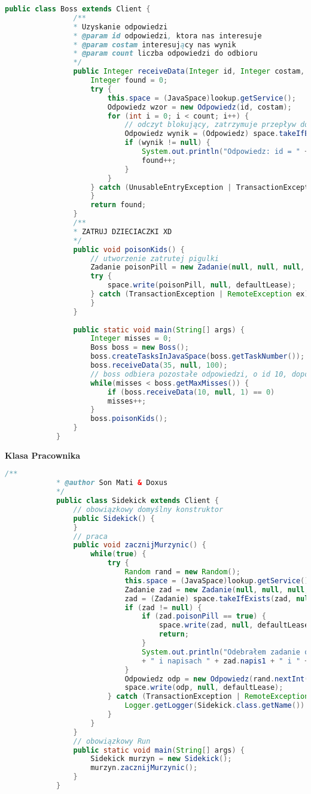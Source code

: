 			\begin{lstlisting}[language=Java]
			public class Boss extends Client {
				/**
				* Uzyskanie odpowiedzi
				* @param id odpowiedzi, ktora nas interesuje
				* @param costam interesujący nas wynik
				* @param count liczba odpowiedzi do odbioru
				*/
				public Integer receiveData(Integer id, Integer costam, Integer count) {
					Integer found = 0;
					try {
						this.space = (JavaSpace)lookup.getService();
						Odpowiedz wzor = new Odpowiedz(id, costam);
						for (int i = 0; i < count; i++) {
							// odczyt blokujący, zatrzymuje przepływ dopóki odp się nie pojawi
							Odpowiedz wynik = (Odpowiedz) space.takeIfExists(wzor, null, defaultLease);
							if (wynik != null) {
								System.out.println("Odpowiedz: id = " + wynik.getId() + ", wynik = " + wynik.getWynik());
								found++;
							}
						}
					} catch (UnusableEntryException | TransactionException | InterruptedException | RemoteException ex) {
					}
					return found;
				}
				/**
				* ZATRUJ DZIECIACZKI XD
				*/
				public void poisonKids() {
					// utworzenie zatrutej pigulki
					Zadanie poisonPill = new Zadanie(null, null, null, true);
					try {
						space.write(poisonPill, null, defaultLease);
					} catch (TransactionException | RemoteException ex) {
					}
				}
				
				public static void main(String[] args) {
					Integer misses = 0;
					Boss boss = new Boss();
					boss.createTasksInJavaSpace(boss.getTaskNumber());
					boss.receiveData(35, null, 100);
					// boss odbiera pozostałe odpowiedzi, o id 10, dopóki nie trafi na pewną liczbę chybień
					while(misses < boss.getMaxMisses()) {
						if (boss.receiveData(10, null, 1) == 0)
						misses++;
					}
					boss.poisonKids();
				}
			}
			\end{lstlisting}
			\newpage
			\textbf{Klasa Pracownika}
			\begin{lstlisting}[language=Java]
			/**
			* @author Son Mati & Doxus
			*/
			public class Sidekick extends Client {
				// obowiązkowy domyślny konstruktor
				public Sidekick() {
				}
				// praca
				public void zacznijMurzynic() {
					while(true) {
						try {
							Random rand = new Random();
							this.space = (JavaSpace)lookup.getService();
							Zadanie zad = new Zadanie(null, null, null, null);
							zad = (Zadanie) space.takeIfExists(zad, null, defaultLease);
							if (zad != null) {
								if (zad.poisonPill == true) {
									space.write(zad, null, defaultLease);
									return;
								}
								System.out.println("Odebrałem zadanie o id " + zad.liczba
								+ " i napisach " + zad.napis1 + " i " + zad.napis2);
							}
							Odpowiedz odp = new Odpowiedz(rand.nextInt(51), rand.nextInt(1000));
							space.write(odp, null, defaultLease);
						} catch (TransactionException | RemoteException | UnusableEntryException | InterruptedException ex) {
							Logger.getLogger(Sidekick.class.getName()).log(Level.SEVERE, null, ex);
						}
					}
				}
				// obowiązkowy Run
				public static void main(String[] args) {
					Sidekick murzyn = new Sidekick();
					murzyn.zacznijMurzynic();
				}
			}
			\end{lstlisting}
	\newpage
